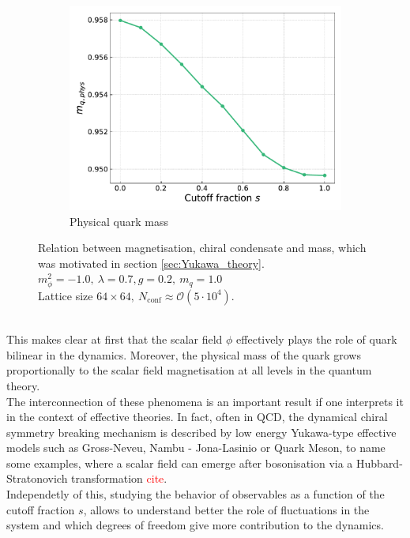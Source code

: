 \begin{figure}[h]
\begin{subfigure}[b]{0.47\textwidth}
        \includegraphics[width=1.0\textwidth]{figures/slide_broken/mass.pdf}
        \caption{Physical quark mass}
    \end{subfigure}
    \caption[Relation between magnetisation, condensate and mass]{Relation between magnetisation, chiral condensate and mass, which was motivated in section \ref{sec:Yukawa_theory}. \\ $m_\phi^2=-1.0, \ \lambda=0.7, g=0.2, \ m_q = 1.0$ \\ Lattice size $64 \times 64, \ N_\text{conf} \approx \mathcal{O}(5 \cdot 10^4)$.}
    \label{fig:interpolation_relation_phi_cond_mass}
\end{figure} \\
This makes clear at first that the scalar field $\phi$ effectively plays the role of quark bilinear in the dynamics. Moreover, the physical mass of the quark grows proportionally to the scalar field magnetisation at all levels in the quantum theory. \\
The interconnection of these phenomena is an important result if one interprets it in the context of effective theories. In fact, often in QCD, the dynamical chiral symmetry breaking mechanism is described by low energy Yukawa-type effective models such as Gross-Neveu, Nambu - Jona-Lasinio or Quark Meson, to name some examples, where a scalar field can emerge after bosonisation via a Hubbard-Stratonovich transformation \textcolor{red}{cite}. \\
Independetly of this, studying the behavior of observables as a function of the cutoff fraction $s$, allows to understand better the role of fluctuations in the system and which degrees of freedom give more contribution to the dynamics.
